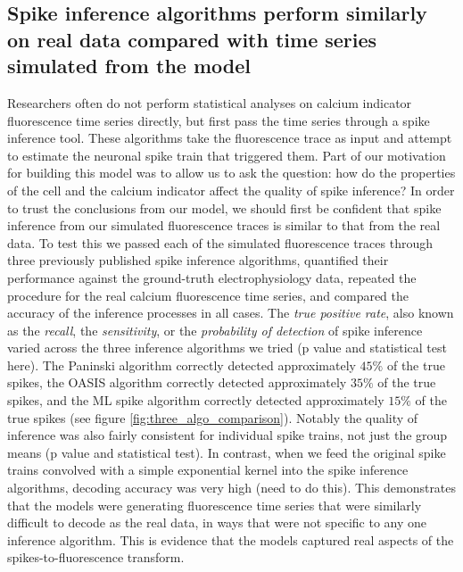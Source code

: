 \documentclass[a4paper,12pt]{article}
\theoremstyle{definition}
\begin{document}
\subsection{Spike inference algorithms perform similarly on real data compared with time series simulated from the model}
Researchers often do not perform statistical analyses on calcium indicator fluorescence time series directly, but first pass the time series through a spike inference tool. These algorithms take the fluorescence trace as input and attempt to estimate the neuronal spike train that triggered them. Part of our motivation for building this model was to allow us to ask the question: how do the properties of the cell and the calcium indicator affect the quality of spike inference? In order to trust the conclusions from our model, we should first be confident that spike inference from our simulated fluorescence traces is similar to that from the real data. To test this we passed each of the simulated fluorescence traces through three previously published spike inference algorithms, quantified their performance against the ground-truth electrophysiology data, repeated the procedure for the real calcium fluorescence time series, and compared the accuracy of the inference processes in all cases. The \textit{true positive rate}, also known as the \textit{recall}, the \textit{sensitivity}, or the \textit{probability of detection} of spike inference varied across the three inference algorithms we tried (p value and statistical test here). The Paninski algorithm \cite{pnevmatikakis} correctly detected approximately $45\%$ of the true spikes, the OASIS algorithm \cite{friedrich} correctly detected approximately $35\%$ of the true spikes, and the ML spike algorithm \cite{deneux} correctly detected approximately $15\%$ of the true spikes (see figure \ref{fig:three_algo_comparison}). Notably the quality of inference was also fairly consistent for individual spike trains, not just the group means (p value and statistical test). In contrast, when we feed the original spike trains convolved with a simple exponential kernel into the spike inference algorithms, decoding accuracy was very high (need to do this). This demonstrates that the models were generating fluorescence time series that were similarly difficult to decode as the real data, in ways that were not specific to any one inference algorithm. This is evidence that the models captured real aspects of the spikes-to-fluorescence transform.
\end{document}

